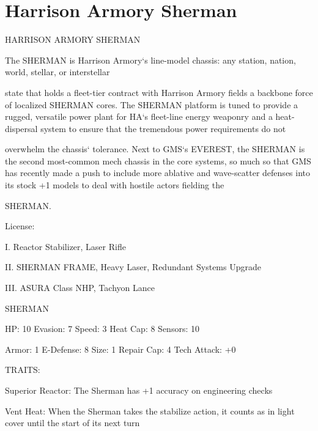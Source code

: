 \section{Harrison Armory Sherman}
                                                                                                                      


                              HARRISON ARMORY SHERMAN  

The SHERMAN is Harrison Armory‘s line-model chassis: any station, nation, world, stellar, or interstellar  

state that holds a fleet-tier contract with Harrison Armory fields a backbone force of localized SHERMAN  
cores. The SHERMAN platform is tuned to provide a rugged, versatile power plant for HA‘s fleet-line  
energy weaponry and a heat-dispersal system to ensure that the tremendous power requirements do not  

overwhelm the chassis‘ tolerance. Next to GMS‘s EVEREST, the SHERMAN is the second most-common  
mech chassis in the core systems, so much so that GMS has recently made a push to include more  
ablative and wave-scatter defenses into its stock +1 models to deal with hostile actors fielding the  

SHERMAN.   

                                                  License:
 
I. Reactor Stabilizer, Laser Rifle
 
II. SHERMAN FRAME, Heavy Laser, Redundant Systems Upgrade
 
III. ASURA Class NHP, Tachyon Lance
 

                                                SHERMAN 

 HP: 10         Evasion: 7                            Speed: 3           Heat Cap: 8       Sensors: 10 

 Armor: 1       E-Defense: 8                          Size: 1            Repair Cap: 4     Tech Attack:  
                                                                                           +0 

                                                  TRAITS: 

 Superior Reactor: The Sherman has +1 accuracy on engineering checks
 
 Vent Heat: When the Sherman takes the stabilize action, it counts as in light cover until the start of its  
 next turn 

